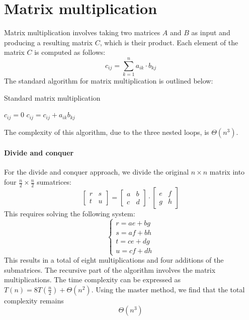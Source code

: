 \section{Matrix multiplication}

Matrix multiplication involves taking two matrices $A$ and $B$ as input and producing a resulting matrix $C$, which is their product.
Each element of the matrix $C$ is computed as follows:
\[c_{ij}=\sum_{k=1}^{n}a_{ik}\cdot b_{kj}\]
The standard algorithm for matrix multiplication is outlined below:
\begin{algorithm}[H]
    \caption{Standard matrix multiplication}
        \begin{algorithmic}[1]
                    \State $c_{ij} = 0$
                        \State $c_{ij} = c_{ij}+a_{ik} b_{kj}$
                    \EndFor
                \EndFor
            \EndFor
        \end{algorithmic}
\end{algorithm}
The complexity of this algorithm, due to the three nested loops, is $\Theta(n^3)$.

\paragraph*{Divide and conquer}
For the divide and conquer approach, we divide the original $n\times n$ matrix into four $\frac{n}{2}\times\frac{n}{2}$ sumatrices: 
\[\begin{bmatrix} r & s \\ t & u \end{bmatrix}=\begin{bmatrix} a & b \\ c & d \end{bmatrix} \cdot \begin{bmatrix} e & f \\ g & h \end{bmatrix}\]
This requires solving the following system:
\[\begin{cases} r = ae + bg \\ s = af + bh \\ t = ce + dg \\ u = cf + dh \end{cases}\]
This results in a total of eight multiplications and four additions of the submatrices. 
The recursive part of the algorithm involves the matrix multiplications. 
The time complexity can be expressed as $T(n)=8T\left(\frac{n}{2}\right)+\Theta(n^2)$.
Using the master method, we find that the total complexity remains 
\[\Theta(n^3)\]

